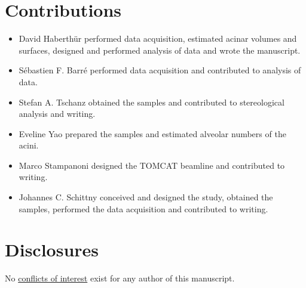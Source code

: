 \documentclass[paper=a4,DIV=calc,abstract,english]{scrartcl}
\begin{document}
\section*{Contributions}
\begin{itemize}
	\item David Haberthür performed data acquisition, estimated acinar volumes and surfaces, designed and performed analysis of data and wrote the manuscript.
	\item Sébastien F. Barré performed data acquisition and contributed to analysis of data.
	\item Stefan A. Tschanz obtained the samples and contributed to stereological analysis and writing.
	\item Eveline Yao prepared the samples and estimated alveolar numbers of the acini.
	\item Marco Stampanoni designed the TOMCAT beamline and contributed to writing.
	\item Johannes C. Schittny conceived and designed the study, obtained the samples, performed the data acquisition and contributed to writing.
\end{itemize}

\section*{Disclosures}
No \href{http://www.the-aps.org/mm/Publications/Preparing-Your-Manuscript#conflicts}{conflicts of interest} exist for any author of this manuscript.

\clearpage
\listoffigures

\clearpage
\doublespacing


\end{document}
